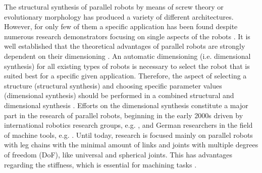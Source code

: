 \documentclass[fleqn,a4paper,10pt]{article}
\begin{document}
\begin{multicols}{2}
The structural synthesis of parallel robots by means of screw theory \cite{KongGos2007} or evolutionary morphology \cite{Gogu2008} has produced a variety of different architectures.
However, for only few of them a specific application has been found despite numerous research demonstrators focusing on single aspects of the robots \cite{Merlet2006}.
It is well established that the theoretical advantages of parallel robots are strongly dependent on their dimensioning \cite{Merlet2006}. %
An automatic dimensioning (i.e. dimensional synthesis) for all existing types of robots is necessary to select the robot that is suited best for a specific given application.
Therefore, the aspect of selecting a structure (structural synthesis) and choosing specific parameter values (dimensional synthesis) should be performed in a combined structural and dimensional synthesis \cite{Krefft2006}.
Efforts on the dimensional synthesis constitute a major part in the research of parallel robots, beginning in the early 2000s driven by international robotics research groups, e.g. \cite{Merlet2006,CarboneOttCec2007}, and German researchers in the field of machine tools, e.g. \cite{MbarekNefCor2005,Krefft2006,FrindtKreHes2010}.
Until today, research is focused mainly on parallel robots with leg chains with the minimal amount of links and joints with multiple degrees of freedom (DoF), like universal and spherical joints.
This has advantages regarding the stiffness, which is essential for machining tasks \cite{MbarekNefCor2005}.


\begin{figure}[b]
    \centering
    \vspace{-0.3cm} %
    
    \vspace{-0.5cm} %
    \label{fig:details_kindyn}
\end{figure}

%


\end{multicols}
\end{document}
